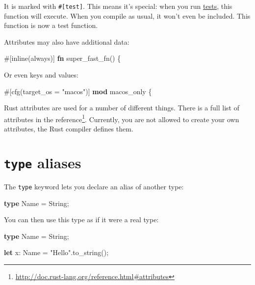 \documentclass[a4paper,]{book}
\newenvironment{Shaded}{\begin{snugshade}}{\end{snugshade}}
\newcommand{\KeywordTok}[1]{\textcolor[rgb]{0.13,0.29,0.53}{\textbf{{#1}}}}
\newcommand{\DataTypeTok}[1]{\textcolor[rgb]{0.13,0.29,0.53}{{#1}}}
\newcommand{\StringTok}[1]{\textcolor[rgb]{0.31,0.60,0.02}{{#1}}}
\newcommand{\AttributeTok}[1]{\textcolor[rgb]{0.77,0.63,0.00}{{#1}}}
\newcommand{\NormalTok}[1]{{#1}}
\renewcommand{\href}[2]{#2\footnote{\url{#1}}}
\begin{document}
It is marked with \texttt{\#{[}test{]}}. This means it's special: when
you run \protect\hyperlink{sec--testing}{tests}, this function will
execute. When you compile as usual, it won't even be included. This
function is now a test function.

Attributes may also have additional data:

\begin{Shaded}
\begin{Highlighting}[]
\AttributeTok{#[}\NormalTok{inline}\AttributeTok{(}\NormalTok{always}\AttributeTok{)]}
\KeywordTok{fn} \NormalTok{super_fast_fn() \{}
\end{Highlighting}
\end{Shaded}

Or even keys and values:

\begin{Shaded}
\begin{Highlighting}[]
\AttributeTok{#[}\NormalTok{cfg}\AttributeTok{(}\NormalTok{target_os }\AttributeTok{=} \StringTok{"macos"}\AttributeTok{)]}
\KeywordTok{mod} \NormalTok{macos_only \{}
\end{Highlighting}
\end{Shaded}

Rust attributes are used for a number of different things. There is a
full list of attributes
\href{http://doc.rust-lang.org/reference.html\#attributes}{in the
reference}. Currently, you are not allowed to create your own
attributes, the Rust compiler defines them.

\hypertarget{sec--type-aliases}{\section{\texorpdfstring{\texttt{type}
aliases}{type aliases}}\label{sec--type-aliases}}

The \texttt{type} keyword lets you declare an alias of another type:

\begin{Shaded}
\begin{Highlighting}[]
\KeywordTok{type} \NormalTok{Name = }\DataTypeTok{String}\NormalTok{;}
\end{Highlighting}
\end{Shaded}

You can then use this type as if it were a real type:

\begin{Shaded}
\begin{Highlighting}[]
\KeywordTok{type} \NormalTok{Name = }\DataTypeTok{String}\NormalTok{;}

\KeywordTok{let} \NormalTok{x: Name = }\StringTok{"Hello"}\NormalTok{.to_string();}
\end{Highlighting}
\end{Shaded}
\end{document}
